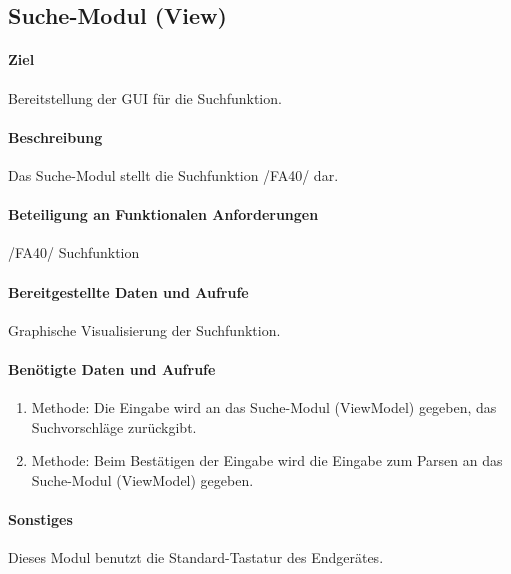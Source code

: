\subsection{Suche-Modul (View)}
\paragraph{Ziel}
Bereitstellung der GUI für die Suchfunktion.
\paragraph{Beschreibung}
Das Suche-Modul stellt die Suchfunktion /FA40/ dar.
\paragraph{Beteiligung an Funktionalen Anforderungen}
/FA40/ Suchfunktion
\paragraph{Bereitgestellte Daten und Aufrufe}
Graphische Visualisierung der Suchfunktion.
\paragraph{Benötigte Daten und Aufrufe}
\begin{enumerate}
    \item Methode: Die Eingabe wird an das Suche-Modul (ViewModel) gegeben, das Suchvorschläge zurückgibt.
    \item Methode: Beim Bestätigen der Eingabe wird die Eingabe zum Parsen an das Suche-Modul (ViewModel) gegeben.
\end{enumerate}
\paragraph{Sonstiges}
Dieses Modul benutzt die Standard-Tastatur des Endgerätes.